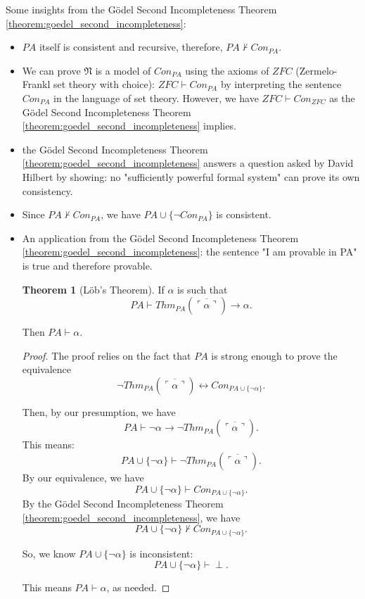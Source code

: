 \documentclass[11pt,letterpaper]{book}
\theoremstyle{definition}
\newtheorem{theorem}{Theorem}[section]
\begin{document}
Some insights from the G\"odel Second Incompleteness Theorem \ref{theorem:goedel_second_incompleteness}:
\begin{itemize}
\item{$PA$ itself is consistent and recursive, therefore, $PA \not \vdash Con_{PA}$.}
\item{We can prove $\mathfrak{N}$ is a model of $Con_{PA}$ using the axioms of $ZFC$ (Zermelo-Frankl set theory with choice): $ZFC \vdash Con_{PA}$ by interpreting the sentence $Con_{PA}$ in the language of set theory. However, we have $ZFC \vdash Con_{ZFC}$ as the G\"odel Second Incompleteness Theorem \ref{theorem:goedel_second_incompleteness} implies.}
\item{the G\"odel Second Incompleteness Theorem \ref{theorem:goedel_second_incompleteness} answers a question asked by David Hilbert by showing: no "sufficiently powerful formal system" can prove its own consistency.}
\item{ Since $PA \not \vdash Con_{PA}$, we have $PA \cup \{ \lnot Con_{PA} \}$ is consistent. }
\item{An application from the G\"odel Second Incompleteness Theorem \ref{theorem:goedel_second_incompleteness}: the sentence "I am provable in PA" is true and therefore provable.
\begin{theorem}[L\"ob's Theorem]
If $\alpha$ is such that
$$ PA \vdash Thm_{PA} (\overline{\ulcorner \alpha \urcorner}) \rightarrow \alpha .$$

Then $PA \vdash \alpha$.
\end{theorem}

\begin{proof}
The proof relies on the fact that $PA$ is strong enough to prove the equivalence
$$  \lnot Thm_{PA} (\overline{\ulcorner \alpha \urcorner}) \leftrightarrow Con_{PA \cup \{ \lnot \alpha  \}} . $$

Then, by our presumption, we have
$$ PA \vdash \lnot \alpha \rightarrow \lnot Thm_{PA} (\overline{\ulcorner \alpha \urcorner}) .$$
This means:
$$ PA \cup \{ \lnot \alpha  \} \vdash \lnot Thm_{PA} (\overline{\ulcorner \alpha \urcorner}) . $$
By our equivalence, we have
$$ PA \cup \{ \lnot \alpha  \} \vdash Con_{PA \cup \{ \lnot \alpha  \}} . $$
By the G\"odel Second Incompleteness Theorem \ref{theorem:goedel_second_incompleteness}, we have
$$ PA \cup \{ \lnot \alpha  \} \not \vdash Con_{PA \cup \{ \lnot \alpha  \}} .  $$

So, we know $ PA \cup \{ \lnot \alpha  \} $ is inconsistent:
$$  PA \cup \{ \lnot \alpha  \} \vdash \perp .$$

This means $PA \vdash \alpha$, as needed.

\end{proof}
}
\end{itemize}

\end{document}

